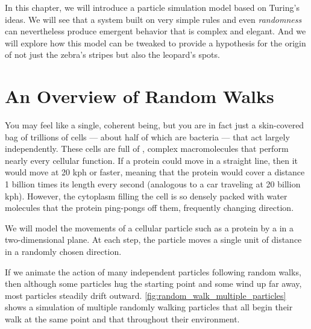 In this chapter, we will introduce a particle simulation model based on Turing's ideas. We will see that a system built on very simple rules and even \textit{randomness} can nevertheless produce emergent behavior that is complex and elegant. And we will explore how this model can be tweaked to provide a hypothesis for the origin of not just the zebra's stripes but also the leopard's spots.\\

\FloatBarrier
{}

\section{An Overview of Random Walks}
\label{sec:an_overview_of_random_walks}

You may feel like a single, coherent being, but you are in fact just a skin-covered bag of trillions of cells --- about half of which are bacteria --- that act largely independently. These cells are full of , complex macromolecules that perform nearly every cellular function. If a protein could move in a straight line, then it would move at 20 kph or faster, meaning that the protein would cover a distance 1 billion times its length every second (analogous to a car traveling at 20 billion kph). However, the cytoplasm filling the cell is so densely packed with water molecules that the protein ping-pongs off them, frequently changing direction.

We will model the movements of a cellular particle such as a protein by a  in a two-dimensional plane. At each step, the particle moves a single unit of distance in a randomly chosen direction.

If we animate the action of many independent particles following random walks, then although some particles hug the starting point and some wind up far away, most particles steadily drift outward. \autoref{fig:random_walk_multiple_particles} shows a simulation of multiple randomly walking particles that all begin their walk at the same point and that  throughout their environment.
\\

